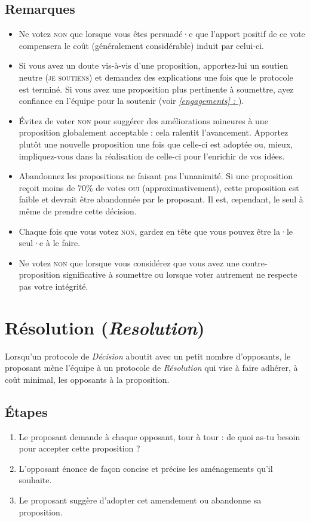 \documentclass[11pt]{book}
\newcommand*{\fullref}[1]{\textit{\hyperref[{#1}]{\autoref*{#1} : \nameref*{#1}}}}
\let\oldsection\section
\renewcommand\section{\clearpage\oldsection}
\begin{document}
\subsection{Remarques}
\begin{itemize}
	\item Ne votez \textsc{non} que lorsque vous êtes persuadé·e que l'apport positif de ce vote compensera le coût (généralement considérable) induit par celui-ci.
	\item Si vous avez un doute vis-à-vis d'une proposition, apportez-lui un soutien neutre (\textsc{je soutiens}) et demandez des explications une fois que le
	      protocole est terminé. Si vous avez une proposition plus pertinente à soumettre, ayez confiance en l'équipe pour la soutenir (voir \fullref{engagements}).
	\item Évitez de voter \textsc{non} pour suggérer des améliorations mineures à une proposition globalement acceptable : cela ralentit l'avancement. Apportez
	      plutôt une nouvelle proposition une fois que celle-ci est adoptée ou, mieux, impliquez-vous dans la réalisation de celle-ci pour l'enrichir de vos idées.
	\item Abandonnez les propositions ne faisant pas l'unanimité. Si une proposition reçoit moins de 70\% de votes \textsc{oui} (approximativement), cette proposition
	      est faible et devrait être abandonnée par le proposant. Il est, cependant, le seul à même de prendre cette décision.
	\item Chaque fois que vous votez \textsc{non}, gardez en tête que vous pouvez être la·le seul·e à le faire.
	\item Ne votez \textsc{non} que lorsque vous considérez que vous avez une contre-proposition significative à soumettre ou lorsque voter autrement ne respecte pas
	      votre intégrité.
\end{itemize}

\section{Résolution (\emph{Resolution})} \label{protocole-resolution}

Lorsqu'un protocole de \emph{Décision} aboutit avec un petit nombre d'opposants, le proposant mène l'équipe à un protocole de \emph{Résolution} qui vise à faire adhérer,
à coût minimal, les opposants à la proposition.

\subsection{Étapes}
\begin{enumerate}
	\item Le proposant demande à chaque opposant, tour à tour : \og{}de quoi as-tu besoin pour accepter cette proposition ?\fg{}
	\item L'opposant énonce de façon concise et précise les aménagements qu'il souhaite.
	\item Le proposant suggère d'adopter cet amendement ou abandonne sa proposition.
\end{enumerate}
\end{document}
